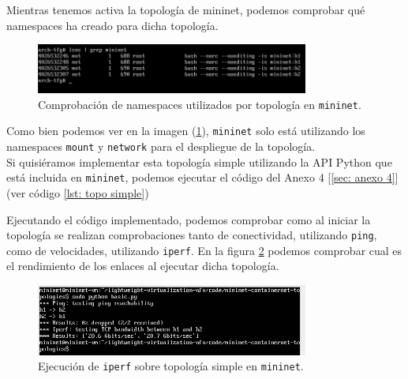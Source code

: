 \documentclass[12pt]{article}
\begin{document}
	
	\noindent Mientras tenemos activa la topología de mininet, podemos comprobar qué namespaces ha creado para dicha topología. 
	
	\begin{figure}[h!]
		\begin{center}
			\includegraphics[width=0.8\textwidth]{img/mn_single_3.png}
			\caption{Comprobación de namespaces utilizados por topología en \texttt{mininet}.}
			\label{img: lsns mininet 1}	
		\end{center}
	\end{figure}

	\noindent Como bien podemos ver en la imagen (\ref{img: lsns mininet 1}), \texttt{mininet} solo está utilizando los namespaces \texttt{mount} y \texttt{network} para el despliegue de la topología. \\
	
	\noindent Si quisiéramos implementar esta topología simple utilizando la API Python que está incluida en \texttt{mininet}, podemos ejecutar el código del Anexo 4 [\ref{sec: anexo 4}] (ver código \ref{lst: topo simple})
	
	\pagebreak
	
	\noindent Ejecutando el código implementado, podemos comprobar como al iniciar la topología se realizan comprobaciones tanto de conectividad, utilizando \texttt{ping}, como de velocidades, utilizando \texttt{iperf}. En la figura \ref{img: iperf mn simple} podemos comprobar cual es el rendimiento de los enlaces al ejecutar dicha topología.
	
	\begin{figure}[h!]
		\begin{center}
			\includegraphics[width=0.8\textwidth]{img/mn_single_4.png}
			\caption{Ejecución de \texttt{iperf} sobre topología simple en \texttt{mininet}.}
			\label{img: iperf mn simple}	
		\end{center}
	\end{figure}
	
\end{document}
